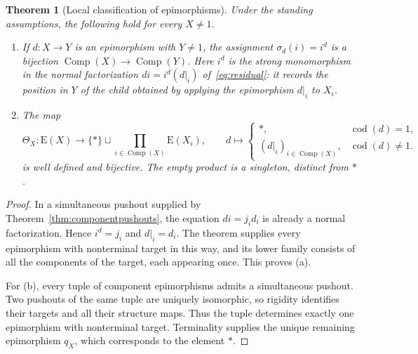 \documentclass[11pt,a4paper]{article}
\theoremstyle{plain}
\newtheorem{theorem}{Theorem}[section]
\theoremstyle{definition}
\theoremstyle{remark}
\newcommand{\one}{1}
\newcommand{\cod}{\operatorname{cod}}
\newcommand{\Comp}{\operatorname{Comp}}
\newcommand{\Out}{\mathrm{E}}
\begin{document}
\begin{theorem}[Local classification of epimorphisms]\label{thm:epicclassification}
Under the standing assumptions, the following hold for every $X\ne\one$.
\begin{enumerate}
\item If $d:X\to Y$ is an epimorphism with $Y\ne\one$, the assignment
$\sigma_d(i)=i^d$ is a bijection
$\Comp(X)\to\Comp(Y)$.
Here $i^d$ is the strong monomorphism in the normal factorization
$di=i^d(d|_i)$ of~\eqref{eq:residual}: it records the position
in $Y$ of the child obtained by applying the epimorphism $d|_i$
to $X_i$.
\item The map
\begin{equation}\label{eq:epicclassification}
 \Theta_X:\Out(X)\longrightarrow
 \{*\}\sqcup\prod_{i\in\Comp(X)}\Out(X_i),\qquad
d\longmapsto
 \begin{cases}
 *,&\cod(d)=\one,\\
 (d|_i)_{i\in\Comp(X)},&\cod(d)\ne\one.
\end{cases}
\end{equation}
is well defined and bijective. The empty product is a singleton,
distinct from $*$.
\end{enumerate}
\end{theorem}
\begin{proof}
In a simultaneous pushout supplied by
Theorem~\ref{thm:componentpushouts}, the equation $di=j_i d_i$
is already a normal factorization. Hence $i^d=j_i$ and
$d|_i=d_i$. The theorem supplies every epimorphism with
nonterminal target in this way, and its lower family consists
of all the components of the target, each appearing once.
This proves \textup{(a)}.

For \textup{(b)}, every tuple of component epimorphisms admits
a simultaneous pushout. Two pushouts of the same tuple are
uniquely isomorphic, so rigidity identifies their targets and
all their structure maps. Thus the tuple determines exactly
one epimorphism with nonterminal target. Terminality supplies
the unique remaining epimorphism $q_X$, which corresponds to
the element $*$.
\end{proof}
\end{document}
